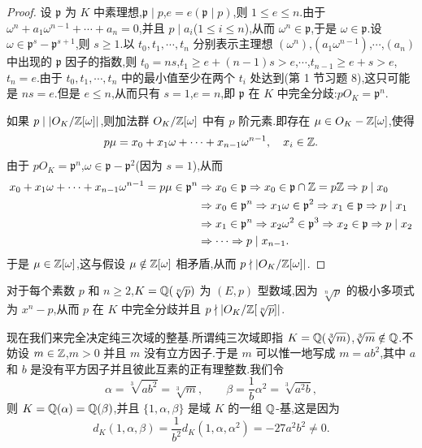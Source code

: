 \begin{proof}
设 $\mathfrak{p}$ 为 $K$ 中素理想,$\mathfrak{p}\mid p$,$e=e(\mathfrak{p}\mid p)$,则 $1\leqslant e\leqslant n$.由于 $\omega^n+a_1\omega^{n-1}+\cdots+a_n=0$,并且 $p\mid a_i$($1\leqslant i\leqslant n$),从而 $\omega^n\in\mathfrak{p}$,于是 $\omega\in\mathfrak{p}$.设 $\omega\in\mathfrak{p}^s-\mathfrak{p}^{s+1}$,则 $s\geqslant 1$.以 $t_0,t_1,\cdots,t_n$ 分别表示主理想 $(\omega^n)$,$(a_1\omega^{n-1})$,$\cdots$,$(a_n)$ 中出现的 $\mathfrak{p}$ 因子的指数,则 $t_0=ns$,$t_1\geqslant e+(n-1)s>e$,$\cdots$,$t_{n-1}\geqslant e+s>e$,$t_n=e$.由于 $t_0,t_1,\cdots,t_n$ 中的最小值至少在两个 $t_i$ 处达到(第 1 节习题 8),这只可能是 $ns=e$.但是 $e\leqslant n$,从而只有 $s=1$,$e=n$,即 $\mathfrak{p}$ 在 $K$ 中完全分歧:$pO_K=\mathfrak{p}^n$.

如果 $p\mid|O_K/\mathbb{Z}[\omega]|$,则加法群 $O_K/\mathbb{Z}[\omega]$ 中有 $p$ 阶元素.即存在 $\mu\in O_K-\mathbb{Z}[\omega]$,使得
\[
  p\mu=x_0+x_1\omega+\cdots+x_{n-1}\omega^{n-1},\quad x_i\in\mathbb{Z}.
\]
由于 $pO_K=\mathfrak{p}^n$,$\omega\in\mathfrak{p}-\mathfrak{p}^2$(因为 $s=1$),从而
\begin{align*}
  x_0+x_1\omega+\cdots+x_{n-1}\omega^{n-1}=p\mu\in\mathfrak{p}^n
  &\Rightarrow x_0\in\mathfrak{p}\Rightarrow x_0\in\mathfrak{p}\cap\mathbb{Z}=p\mathbb{Z}\Rightarrow p\mid x_0\\
  &\Rightarrow x_0\in\mathfrak{p}^n\Rightarrow x_1\omega\in\mathfrak{p}^2\Rightarrow x_1\in\mathfrak{p}\Rightarrow p\mid x_1\\
  &\Rightarrow x_1\in\mathfrak{p}^n\Rightarrow x_2\omega^2\in\mathfrak{p}^3\Rightarrow x_2\in\mathfrak{p}\Rightarrow p\mid x_2\\
  &\Rightarrow\cdots\Rightarrow p\mid x_{n-1}.
\end{align*}
于是 $\mu\in\mathbb{Z}[\omega]$,这与假设 $\mu\notin\mathbb{Z}[\omega]$ 相矛盾,从而 $p\nmid|O_K/\mathbb{Z}[\omega]|$.
\end{proof}

\begin{example}\label{ex:ch2-s2-5-1}
对于每个素数 $p$ 和 $n\geqslant 2$,$K=\mathbb{Q}(\sqrt[n]{p})$ 为 $(E,p)$ 型数域,因为 $\sqrt[n]{p}$ 的极小多项式为 $x^n-p$,从而 $p$ 在 $K$ 中完全分歧并且 $p\nmid|O_K/\mathbb{Z}[\sqrt[n]{p}]|$.
\end{example}

现在我们来完全决定纯三次域的整基.所谓纯三次域即指 $K=\mathbb{Q}(\sqrt[3]{m})$,$\sqrt[3]{m}\notin\mathbb{Q}$.不妨设 $m\in\mathbb{Z}$,$m>0$ 并且 $m$ 没有立方因子.于是 $m$ 可以惟一地写成 $m=ab^2$,其中 $a$ 和 $b$ 是没有平方因子并且彼此互素的正有理整数.我们令
\[
  \alpha=\sqrt[3]{ab^2}=\sqrt[3]{m},\qquad
  \beta=\frac{1}{b}\alpha^2=\sqrt[3]{a^2b},
\]
则 $K=\mathbb{Q}(\alpha)=\mathbb{Q}(\beta)$,并且 $\{1,\alpha,\beta\}$ 是域 $K$ 的一组 $\mathbb{Q}$-基,这是因为
\[
  d_K(1,\alpha,\beta)=\frac{1}{b^2}d_K(1,\alpha,\alpha^2)=-27a^2b^2\neq 0.
\]

